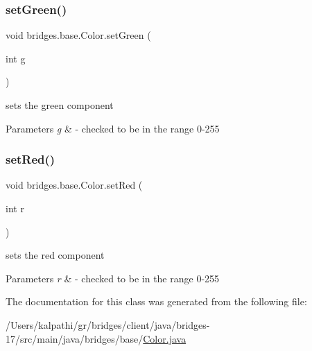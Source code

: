 \subsubsection{\texorpdfstring{set\+Green()}{setGreen()}}
{\footnotesize\ttfamily void bridges.\+base.\+Color.\+set\+Green (\begin{DoxyParamCaption}\item[{int}]{g }\end{DoxyParamCaption})}

sets the green component


\begin{DoxyParams}{Parameters}
{\em g} & -\/ checked to be in the range 0-\/255 \\
\hline
\end{DoxyParams}
\mbox{\label{classbridges_1_1base_1_1_color_a1d78967703924b709e76def5b2b3ee9a}} 
\subsubsection{\texorpdfstring{set\+Red()}{setRed()}}
{\footnotesize\ttfamily void bridges.\+base.\+Color.\+set\+Red (\begin{DoxyParamCaption}\item[{int}]{r }\end{DoxyParamCaption})}

sets the red component


\begin{DoxyParams}{Parameters}
{\em r} & -\/ checked to be in the range 0-\/255 \\
\hline
\end{DoxyParams}


The documentation for this class was generated from the following file\+:\begin{DoxyCompactItemize}
\item 
/\+Users/kalpathi/gr/bridges/client/java/bridges-\/17/src/main/java/bridges/base/\mbox{\hyperlink{_color_8java}{Color.\+java}}\end{DoxyCompactItemize}
